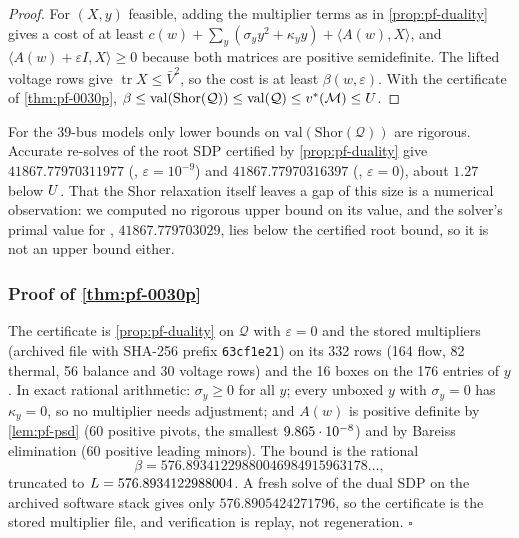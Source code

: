 \begin{proof}
For $(X,y)$ feasible, adding the multiplier terms as in \cref{prop:pf-duality} gives a cost of at least $c(w)+\sum_y(\sigma_yy^2+\kappa_yy)+\langle A(w),X\rangle$, and $\langle A(w)+\varepsilon I,X\rangle\ge0$ because both matrices are positive semidefinite.
The lifted voltage rows give $\operatorname{tr}X\le\bar V^2$, so the cost is at least $\beta(w,\varepsilon)$.
With the certificate of \cref{thm:pf-0030p}, $\beta\le\mathrm{val}(\mathrm{Shor}(\mathcal Q))\le\mathrm{val}(\mathcal Q)\le v^{*}(\mathcal{M})\le U$.
\end{proof}

For the 39-bus models only lower bounds on $\mathrm{val}(\mathrm{Shor}(\mathcal Q))$ are rigorous.
Accurate re-solves of the root SDP certified by \cref{prop:pf-duality} give $41867.77970311977$ (, $\varepsilon=10^{-9}$) and $41867.77970316397$ (, $\varepsilon=0$), about $1.27$ below $U$.
That the Shor relaxation itself leaves a gap of this size is a numerical observation: we computed no rigorous upper bound on its value, and the solver's primal value for , $41867.779703029$, lies  below the certified root bound, so it is not an upper bound either.

\subsubsection{Proof of \texorpdfstring{\cref{thm:pf-0030p}}{the 30-bus theorem}}\label{app:powerflow-0030p}

The certificate is \cref{prop:pf-duality} on $\mathcal Q$ with $\varepsilon=0$ and the stored multipliers (archived file with SHA-256 prefix \texttt{63cf1e21}) on its 332 rows (164 flow, 82 thermal, 56 balance and 30 voltage rows) and the 16 boxes on the 176 entries of $y$.
In exact rational arithmetic: $\sigma_y\ge0$ for all $y$; every unboxed $y$ with $\sigma_y=0$ has $\kappa_y=0$, so no multiplier needs adjustment;
and $A(w)$ is positive definite by \cref{lem:pf-psd} (60 positive pivots, the smallest $9.865\cdot 10^{-8}$) and by Bareiss elimination (60 positive leading minors).
The bound is the rational
\[
\beta=576.89341229880046984915963178\ldots,
\]
truncated to $L=576.8934122988004$.
A fresh solve of the dual SDP on the archived software stack gives only $576.8905424271796$, so the certificate is the stored multiplier file, and verification is replay, not regeneration.
\hfill$\square$

